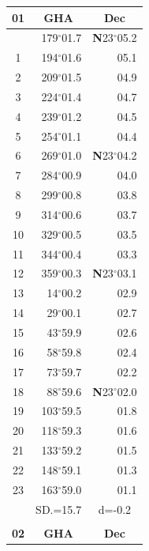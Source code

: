 \documentclass[10pt, a4paper]{report}
\begin{document}
\begin{scriptsize}
\noindent
\begin{tabular*}{0.2\textwidth}[t]{@{\extracolsep{\fill}}|c|rr|}
\hline
\multicolumn{1}{|c|}{\rule{0pt}{2.6ex}\textbf{01}} & \multicolumn{1}{c}{\textbf{GHA}} & \multicolumn{1}{c|}{\textbf{Dec}}\\
\hline\rule{0pt}{2.6ex}\noindent
0 & 179$^\circ$01.7 & \textbf{N}23$^\circ$05.2\\
1 & 194$^\circ$01.6 & 05.1\\
2 & 209$^\circ$01.5 & 04.9\\
3 & 224$^\circ$01.4 & \raisebox{0.24ex}{\boldmath$\cdot$~\boldmath$\cdot$~~}04.7\\
4 & 239$^\circ$01.2 & 04.5\\
5 & 254$^\circ$01.1 & 04.4\\[2Pt]
6 & 269$^\circ$01.0 & \textbf{N}23$^\circ$04.2\\
7 & 284$^\circ$00.9 & 04.0\\
8 & 299$^\circ$00.8 & 03.8\\
9 & 314$^\circ$00.6 & \raisebox{0.24ex}{\boldmath$\cdot$~\boldmath$\cdot$~~}03.7\\
10 & 329$^\circ$00.5 & 03.5\\
11 & 344$^\circ$00.4 & 03.3\\[2Pt]
12 & 359$^\circ$00.3 & \textbf{N}23$^\circ$03.1\\
13 & 14$^\circ$00.2 & 02.9\\
14 & 29$^\circ$00.1 & 02.7\\
15 & 43$^\circ$59.9 & \raisebox{0.24ex}{\boldmath$\cdot$~\boldmath$\cdot$~~}02.6\\
16 & 58$^\circ$59.8 & 02.4\\
17 & 73$^\circ$59.7 & 02.2\\[2Pt]
18 & 88$^\circ$59.6 & \textbf{N}23$^\circ$02.0\\
19 & 103$^\circ$59.5 & 01.8\\
20 & 118$^\circ$59.3 & 01.6\\
21 & 133$^\circ$59.2 & \raisebox{0.24ex}{\boldmath$\cdot$~\boldmath$\cdot$~~}01.5\\
22 & 148$^\circ$59.1 & 01.3\\
23 & 163$^\circ$59.0 & 01.1\\
\hline
\rule{0pt}{2.4ex} & \multicolumn{1}{c}{SD.=15.7} & \multicolumn{1}{c|}{d=-0.2}\\
\hline
\multicolumn{1}{c}{}\\[-0.5ex]\hline
\multicolumn{1}{|c|}{\rule{0pt}{2.6ex}\textbf{02}} & \multicolumn{1}{c}{\textbf{GHA}} & \multicolumn{1}{c|}{\textbf{Dec}}\\

\end{tabular*}
\end{scriptsize}
\end{document}
